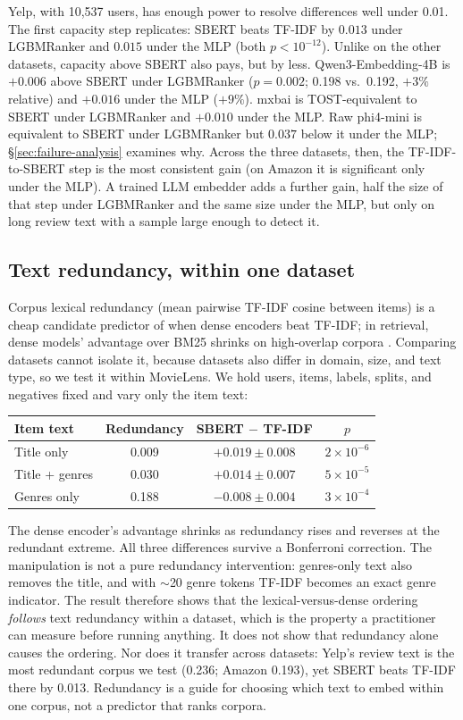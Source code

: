 Yelp, with 10{,}537 users, has enough power to resolve differences well
under 0.01. The first capacity step replicates: SBERT beats TF-IDF by
$0.013$ under LGBMRanker and $0.015$ under the MLP (both $p<10^{-12}$).
Unlike on the other datasets, capacity above SBERT also pays, but by
less. Qwen3-Embedding-4B is $+0.006$ above SBERT under LGBMRanker
($p=0.002$; 0.198 vs.\ 0.192, $+3\%$ relative) and $+0.016$ under the MLP
($+9\%$). mxbai is TOST-equivalent to SBERT under LGBMRanker and
$+0.010$ under the MLP. Raw phi4-mini is equivalent to SBERT under
LGBMRanker but $0.037$ below it under the MLP; \S\ref{sec:failure-analysis}
examines why. Across the three datasets, then, the TF-IDF-to-SBERT step
is the most consistent gain (on Amazon it is significant only under the
MLP). A trained LLM embedder adds a
further gain, half the size of that step under LGBMRanker and the same
size under the MLP, but only on long review text with a sample large
enough to detect it.

\subsection{Text redundancy, within one dataset}
\label{sec:redundancy-analysis}
\label{fig:redundancy-vs-gap}
Corpus lexical redundancy (mean pairwise TF-IDF cosine between items)
is a cheap candidate predictor of when dense encoders beat TF-IDF; in
retrieval, dense models' advantage over BM25 shrinks on high-overlap
corpora \cite{rare-redundancy}. Comparing datasets cannot isolate it,
because datasets also differ in domain, size, and text type, so we test
it within MovieLens. We
hold users, items, labels, splits, and negatives fixed and vary only
the item text:

\begin{center}
\small
\begin{tabular}{lccc}
\toprule
Item text & Redundancy & SBERT $-$ TF-IDF & $p$ \\
\midrule
Title only & 0.009 & $+0.019\pm0.008$ & $2\times10^{-6}$ \\
Title + genres & 0.030 & $+0.014\pm0.007$ & $5\times10^{-5}$ \\
Genres only & 0.188 & $-0.008\pm0.004$ & $3\times10^{-4}$ \\
\bottomrule
\end{tabular}
\end{center}

\noindent The dense encoder's advantage shrinks as redundancy rises and
reverses at the redundant extreme. All three differences survive a
Bonferroni correction. The manipulation is not a pure redundancy
intervention: genres-only text also removes the title, and with
$\sim$20 genre tokens TF-IDF becomes an exact genre indicator. The
result therefore shows that the lexical-versus-dense ordering
\emph{follows} text redundancy within a dataset, which is the property
a practitioner can measure before running anything. It does not show
that redundancy alone causes the ordering. Nor does it transfer across
datasets: Yelp's review text is the most redundant corpus we test
(0.236; Amazon 0.193), yet SBERT beats TF-IDF there by 0.013. Redundancy
is a guide for choosing which text to embed within one corpus, not a
predictor that ranks corpora.

